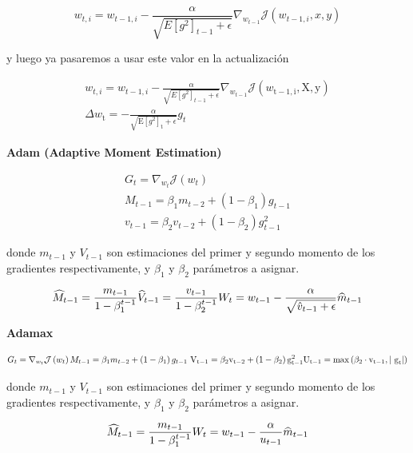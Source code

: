 \documentclass[
  a4paper,
  DIV=11,
  numbers=noendperiod]{scrreprt}
\begin{document}
\[
w_{t, i}=w_{t-1, i}-\frac{\alpha}{\sqrt{E\left[ g^2\right]_{t-1}+\epsilon}} \nabla_{w_{t-1}} \mathcal{J}\left(w_{t-1, i}, x, y\right)
\]

y luego ya pasaremos a usar este valor en la actualización

\[
\begin{gathered}w_{t, i}=w_{t-1, i}-\frac{\alpha}{\sqrt{E\left[g^2\right]_{t-1}+\epsilon}} \nabla_{w_{t-1}} \mathcal{J}\left(w_{\mathrm{t}-1, \mathrm{i}}, \mathrm{X}, \mathrm{y}\right) \\ \Delta w_{\mathrm{t}}=-\frac{\alpha}{\sqrt{\mathrm{E}\left[g^2\right]_{\mathrm{t}}+\epsilon}} g_t\end{gathered}
\]

\textbf{Adam (Adaptive Moment Estimation)}

\[
\begin{gathered}G_t=\nabla_{w_t} \mathcal{J}\left(w_t\right) \\ M_{t-1}=\beta_1 m_{t-2}+\left(1-\beta_1\right) g_{t-1} \\ v_{t-1}=\beta_2 v_{t-2}+\left(1-\beta_2\right) g_{t-1}^2\end{gathered}
\]

donde \(m_{t-1}\) y \(V_{t-1}\) son estimaciones del primer y segundo
momento de los gradientes respectivamente, y \(\beta_1\) y \(\beta_2\)
parámetros a asignar.

\[\widehat{M}_{t-1}  =\frac{m_{t-1}}{1-\beta_1^{t-1}} \\  \widehat{V}_{t-1}  =\frac{v_{t-1}}{1-\beta_2^{t-1}} \\  W_t=w_{t-1}  -\frac{\alpha}{\sqrt{\hat{v}_{t-1}+\epsilon}} \widehat{m}_{t-1}\]

\textbf{Adamax}

\[
G_t=\nabla_{w_t} \mathcal{J}\left(w_t\right) \\ 
M_{t-1}=\beta_1 m_{t-2}+\left(1-\beta_1\right) g_{t-1} \\ 
\mathrm{~V}_{\mathrm{t}-1}=\beta_2 \mathrm{v}_{\mathrm{t}-2}+\left(1-\beta_2\right) \mathrm{g}_{\mathrm{t}-1}^2 \\ 
\mathrm{U}_{\mathrm{t}-1}=\max \left(\beta_2 \cdot \mathrm{v}_{\mathrm{t}-1},\left|\mathrm{~g}_{\mathrm{t}}\right|\right)
\]

donde \(m_{t-1}\) y \(V_{t-1}\) son estimaciones del primer y segundo
momento de los gradientes respectivamente, y \(\beta_1\) y \(\beta_2\)
parámetros a asignar.

\[
\widehat{M}_{t-1}=\frac{m_{t-1}}{1-\beta_1^{t-1}} \\ 
W_t=w_{t-1}-\frac{\alpha}{u_{t-1}} \widehat{m}_{t-1}
\]
\end{document}
